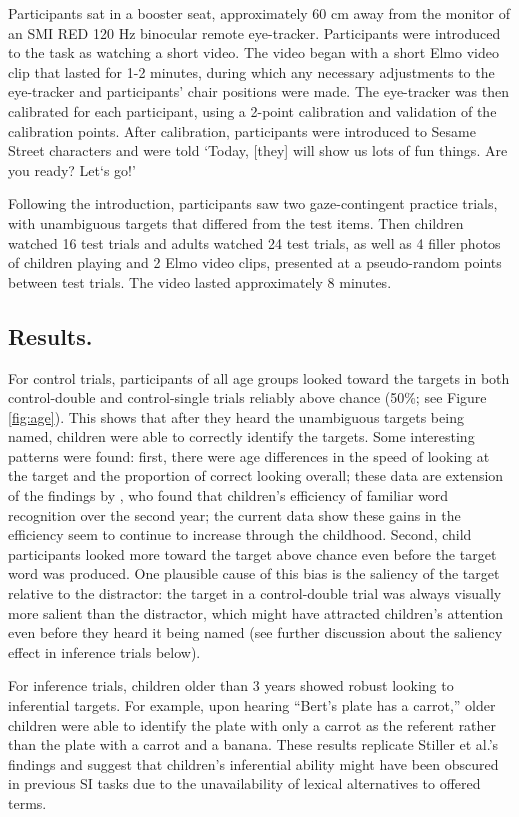 \documentclass[10pt,letterpaper]{article}
\begin{document}
Participants sat in a booster seat, approximately 60 cm away from the monitor of an SMI RED 120 Hz binocular remote eye-tracker. Participants were introduced to the task as watching a short video. The video began with a short Elmo video clip that lasted for 1-2 minutes, during which any necessary adjustments to the eye-tracker and participants' chair positions were made. The eye-tracker was then calibrated for each participant, using a 2-point calibration and validation of the calibration points. After calibration, participants were introduced to Sesame Street characters and were told `Today, [they] will show us lots of fun things. Are you ready? Let`s go!'

Following the introduction, participants saw two gaze-contingent practice trials, with unambiguous targets that differed from the test items. Then children watched 16 test trials and adults watched 24 test trials, as well as 4 filler photos of children playing and 2 Elmo video clips, presented at a pseudo-random points between test trials. The video lasted approximately 8 minutes.

\subsection{Results.}

For control trials, participants of all age groups looked toward the targets in both control-double and control-single trials reliably above chance (50\%; see Figure \ref{fig:age}). This shows that after they heard the unambiguous targets being named, children were able to correctly identify the targets. Some interesting patterns were found: first, there were age differences in the speed of looking at the target and the proportion of correct looking overall; these data are extension of the findings by , who found that children's efficiency of familiar word recognition over the second year; the current data show these gains in the efficiency seem to continue to increase through the childhood. Second, child participants looked more toward the target above chance even before the target word was produced. One plausible cause of this bias is the saliency of the target relative to the distractor: the target in a control-double trial was always visually more salient than the distractor, which might have attracted children's attention even before they heard it being named (see further discussion about the saliency effect in inference trials below). 

For inference trials, children older than 3 years showed robust looking to inferential targets. For example, upon hearing ``Bert's plate has a carrot,'' older children were able to identify the plate with only a carrot as the referent rather than the plate with a carrot and a banana. These results replicate Stiller et al.'s findings and suggest that children's inferential ability might have been obscured in previous SI tasks due to the unavailability of lexical alternatives to offered terms.
\end{document}
